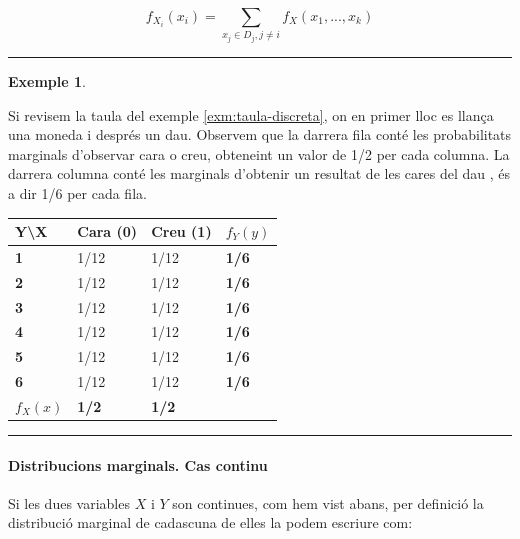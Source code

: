 \documentclass[
  catalan,
]{article}
\newcounter{none} %
\theoremstyle{definition}
\theoremstyle{definition}
\newtheorem{example}{Exemple}[section]
\theoremstyle{definition}
\theoremstyle{definition}
\theoremstyle{remark}
\begin{document}
\[
 f_{X_i}(x_i)= \sum_{x_j \in D_j, j \neq i} f_X(x_1,...,x_k)
\]

\begin{center}\rule{0.5\linewidth}{0.5pt}\end{center}

\begin{example}
\protect\hypertarget{exm:marginal}{}\label{exm:marginal}

Si revisem la taula del exemple \ref{exm:taula-discreta}, on en primer lloc es llança una moneda i després un dau. Observem que la darrera fila conté les probabilitats marginals d'observar cara o creu, obteneint un valor de 1/2 per cada columna. La darrera columna conté les marginals d'obtenir un resultat de les cares del dau , és a dir 1/6 per cada fila.

{\def\LTcaptype{none} %
\begin{longtable}[]{@{}llll@{}}
\toprule\noalign{}
\textbf{Y\textbackslash X} & Cara (0) & Creu (1) & \textbf{\(f_Y(y)\)} \\
\midrule\noalign{}
\endhead
\bottomrule\noalign{}
\endlastfoot
\textbf{1} & 1/12 & 1/12 & \textbf{1/6} \\
\textbf{2} & 1/12 & 1/12 & \textbf{1/6} \\
\textbf{3} & 1/12 & 1/12 & \textbf{1/6} \\
\textbf{4} & 1/12 & 1/12 & \textbf{1/6} \\
\textbf{5} & 1/12 & 1/12 & \textbf{1/6} \\
\textbf{6} & 1/12 & 1/12 & \textbf{1/6} \\
\textbf{\(f_X(x)\)} & \textbf{1/2} & \textbf{1/2} & \\
\end{longtable}
}

\end{example}

\begin{center}\rule{0.5\linewidth}{0.5pt}\end{center}

\paragraph{Distribucions marginals. Cas continu}\label{distribucions-marginals.-cas-continu}

Si les dues variables \(X\) i \(Y\) son continues, com hem vist abans, per definició la distribució marginal de cadascuna de elles la podem escriure com:
\end{document}
